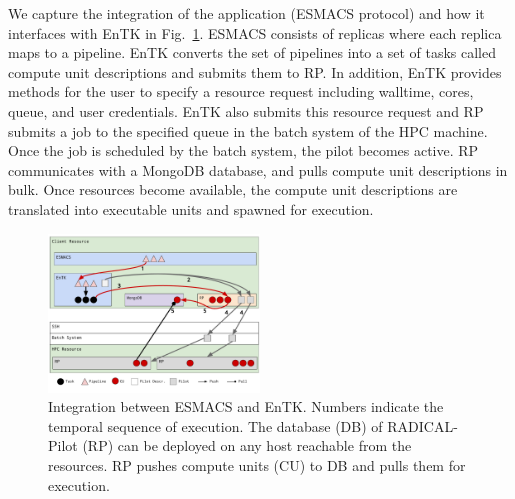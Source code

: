 We capture the integration of the application (ESMACS protocol) and how it
interfaces with EnTK in Fig.~\ref{figure:ht-bac_rp}. ESMACS consists of 
replicas where each replica maps to a pipeline. EnTK converts the set of 
pipelines into a set of tasks
called compute unit descriptions and submits them to RP. In addition, 
EnTK provides methods for the user to specify a resource request 
including walltime, cores, queue, and user credentials. 
EnTK also submits this resource request and RP submits a job to the 
specified queue in the batch system of the HPC machine. Once the job is 
scheduled by the batch system, the pilot becomes active. RP communicates 
with a MongoDB database, and pulls compute unit descriptions in bulk. 
Once resources become available, the compute unit descriptions are 
translated into executable units and spawned for execution.

\begin{figure}
\centering
  \includegraphics[width=0.5\textwidth]{FIGURES/ht-bac-rp_integration.pdf}
  \caption{Integration between ESMACS and EnTK\@. Numbers indicate
  the temporal sequence of execution. The database (DB) of RADICAL-Pilot (RP)
  can be deployed on any host reachable from the resources. RP pushes compute
  units (CU) to DB and pulls them for execution.}
  \label{figure:ht-bac_rp}
\end{figure}


 



